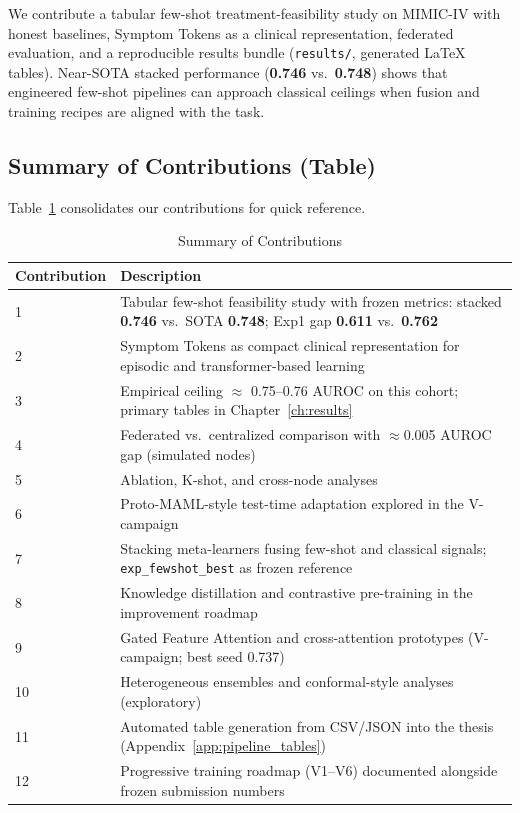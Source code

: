 We contribute a tabular few-shot treatment-feasibility study on MIMIC-IV with honest baselines, Symptom Tokens as a clinical representation, federated evaluation, and a reproducible results bundle (\texttt{results/}, generated LaTeX tables). Near-SOTA stacked performance (\textbf{0.746} vs.\ \textbf{0.748}) shows that engineered few-shot pipelines can approach classical ceilings when fusion and training recipes are aligned with the task.

\subsection{Summary of Contributions (Table)}

Table~\ref{tab:contributions_summary} consolidates our contributions for quick reference.

\begin{table}[htbp]
\centering
\caption{Summary of Contributions}
\small
\begin{tabular}{lp{8cm}}
\toprule
\textbf{Contribution} & \textbf{Description} \\
\midrule
1 & Tabular few-shot feasibility study with frozen metrics: stacked \textbf{0.746} vs.\ SOTA \textbf{0.748}; Exp1 gap \textbf{0.611} vs.\ \textbf{0.762} \\
2 & Symptom Tokens as compact clinical representation for episodic and transformer-based learning \\
3 & Empirical ceiling $\approx$ 0.75--0.76 AUROC on this cohort; primary tables in Chapter~\ref{ch:results} \\
4 & Federated vs.\ centralized comparison with $\approx$0.005 AUROC gap (simulated nodes) \\
5 & Ablation, K-shot, and cross-node analyses \\
6 & Proto-MAML-style test-time adaptation explored in the V-campaign \\
7 & Stacking meta-learners fusing few-shot and classical signals; \texttt{exp\_fewshot\_best} as frozen reference \\
8 & Knowledge distillation and contrastive pre-training in the improvement roadmap \\
9 & Gated Feature Attention and cross-attention prototypes (V-campaign; best seed 0.737) \\
10 & Heterogeneous ensembles and conformal-style analyses (exploratory) \\
11 & Automated table generation from CSV/JSON into the thesis (Appendix~\ref{app:pipeline_tables}) \\
12 & Progressive training roadmap (V1--V6) documented alongside frozen submission numbers \\
\bottomrule
\end{tabular}
\label{tab:contributions_summary}
\end{table}

